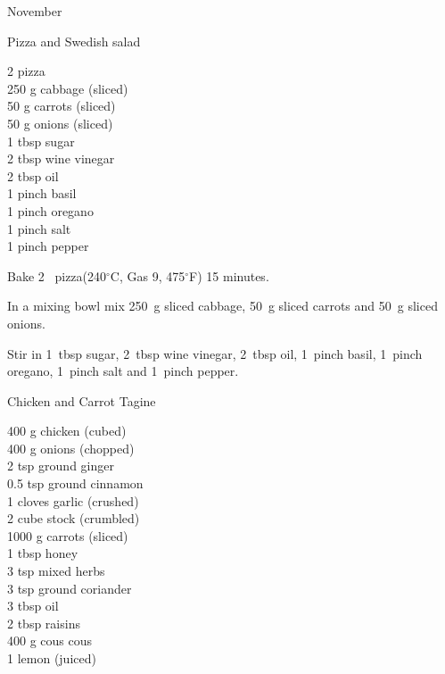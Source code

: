 \begin{menu}{November}
    \begin{recipe}{1}{Pizza and Swedish salad}%
		\begin{ingredients}
		2  pizza  \\
	250 g cabbage (sliced) \\
	50 g carrots (sliced) \\
	50 g onions (sliced) \\
	1 tbsp sugar  \\
	2 tbsp wine vinegar  \\
	2 tbsp oil  \\
	1 pinch basil  \\
	1 pinch oregano  \\
	1 pinch salt  \\
	1 pinch pepper  \\
	
		\end{ingredients}
	
	
    \begin{instructions}
    \item 
        Bake 2~  pizza(240$^{\circ}$C, Gas 9, 475$^{\circ}$F) 15 minutes.
      \item 
        In a mixing bowl mix
        250~g sliced cabbage,
        50~g sliced carrots
        and
        50~g sliced onions.
      \item 
        Stir in
        1~tbsp  sugar,
        2~tbsp  wine vinegar,
        2~tbsp  oil,
        1~pinch  basil,
        1~pinch  oregano,
        1~pinch  salt
        and
        1~pinch  pepper.
      
    \end{instructions}
    \end{recipe}%
  
    \begin{recipe}{2}{Chicken and Carrot Tagine}%
		\begin{ingredients}
		400 g chicken (cubed) \\
	400 g onions (chopped) \\
	2 tsp ground ginger  \\
	0.5 tsp ground cinnamon  \\
	1 cloves garlic (crushed) \\
	2 cube stock (crumbled) \\
	1000 g carrots (sliced) \\
	1 tbsp honey  \\
	3 tsp mixed herbs  \\
	3 tsp ground coriander  \\
	3 tbsp oil  \\
	2 tbsp raisins  \\
	400 g cous cous  \\
	1  lemon (juiced) \\
	

\end{ingredients}
\end{recipe}
\end{menu}
